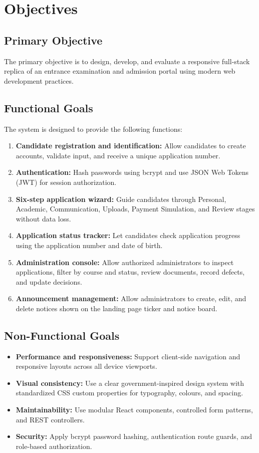 \documentclass[12pt,a4paper,oneside]{report}
\begin{document}
\chapter{Objectives}

\section{Primary Objective}
The primary objective is to design, develop, and evaluate a responsive full-stack replica of an entrance examination and admission portal using modern web development practices.

\section{Functional Goals}
The system is designed to provide the following functions:
\begin{enumerate}
    \item \textbf{Candidate registration and identification:} Allow candidates to create accounts, validate input, and receive a unique application number.
    \item \textbf{Authentication:} Hash passwords using bcrypt and use JSON Web Tokens (JWT) for session authorization.
    \item \textbf{Six-step application wizard:} Guide candidates through Personal, Academic, Communication, Uploads, Payment Simulation, and Review stages without data loss.
    \item \textbf{Application status tracker:} Let candidates check application progress using the application number and date of birth.
    \item \textbf{Administration console:} Allow authorized administrators to inspect applications, filter by course and status, review documents, record defects, and update decisions.
    \item \textbf{Announcement management:} Allow administrators to create, edit, and delete notices shown on the landing page ticker and notice board.
\end{enumerate}

\section{Non-Functional Goals}
\begin{itemize}
    \item \textbf{Performance and responsiveness:} Support client-side navigation and responsive layouts across all device viewports.
    \item \textbf{Visual consistency:} Use a clear government-inspired design system with standardized CSS custom properties for typography, colours, and spacing.
    \item \textbf{Maintainability:} Use modular React components, controlled form patterns, and REST controllers.
    \item \textbf{Security:} Apply bcrypt password hashing, authentication route guards, and role-based authorization.
\end{itemize}
\end{document}
